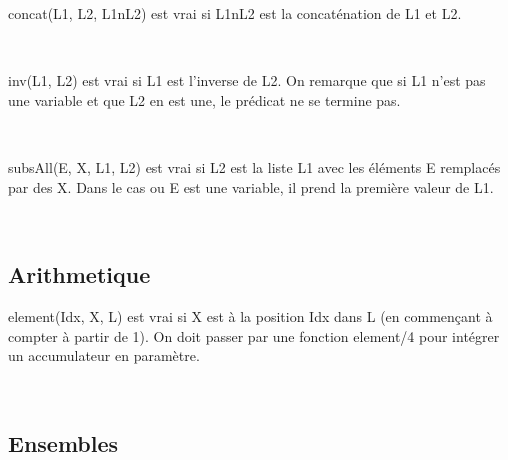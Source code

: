 \documentclass[a4paper, 11pt]{article}
\newenvironment{DDbox}[1]{
\begin{lrbox}{\BBbox}\begin{minipage}{\linewidth}}
{\end{minipage}\end{lrbox}\noindent\colorbox{Zgris}{\usebox{\BBbox}} \\
[.5cm]}
\begin{document}
concat(L1, L2, L1nL2) est vrai si L1nL2 est la concaténation de L1
et L2. \\
\begin{DDbox}{\linewidth}
    
\end{DDbox}

inv(L1, L2) est vrai si L1 est l'inverse de L2. On remarque que si
L1 n'est pas une variable et que L2 en est une, le prédicat ne se
termine pas. \\
\begin{DDbox}{\linewidth}
    
\end{DDbox}

subsAll(E, X, L1, L2) est vrai si L2 est la liste L1 avec les
éléments E remplacés par des X. Dans le cas ou E est une variable,
il prend la première valeur de L1. \\
\begin{DDbox}{\linewidth}
    
\end{DDbox}

%     

\subsection{Arithmetique}
element(Idx, X, L) est vrai si X est à la position Idx dans L (en
commençant à compter à partir de 1). On doit passer par une
fonction element/4 pour intégrer un accumulateur en paramètre. \\
\begin{DDbox}{\linewidth}
    
\end{DDbox}

%     

\subsection{Ensembles}
\begin{DDbox}{\linewidth}
    
\end{DDbox}
\begin{DDbox}{\linewidth}
    
\end{DDbox}
\end{document}
